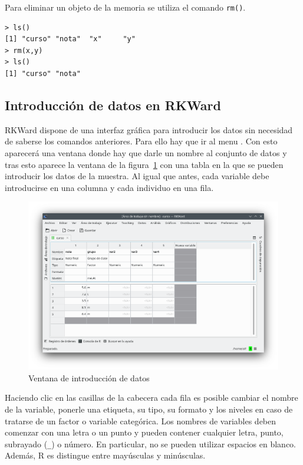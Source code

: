 Para eliminar un objeto de la memoria se utiliza el comando \lstinline{rm()}.
\begin{lstlisting}
> ls()
[1] "curso" "nota"  "x"     "y"    
> rm(x,y)
> ls()
[1] "curso" "nota"
\end{lstlisting}


\subsection{Introducción de datos en RKWard}
RKWard dispone de una interfaz gráfica para introducir los datos sin necesidad de saberse los comandos anteriores.
Para ello hay que ir al menu . Con esto
aparecerá una ventana donde hay que darle un nombre al conjunto de datos y tras esto aparece la ventana de la
figura~\ref{g:matriz_datos} con una tabla en la que se pueden introducir los datos de la muestra.
Al igual que antes, cada variable debe introducirse en una columna y cada individuo en una fila.

\begin{figure}[htp]
\begin{center}
  \includegraphics[width=\textwidth]{capitulos/introduccion/img/matriz_datos}
  \caption{Ventana de introducción de datos}
  \label{g:matriz_datos}
\end{center}
\end{figure}

Haciendo clic en las casillas de la cabecera cada fila es posible cambiar el nombre de la variable, ponerle una
etiqueta, su tipo, su formato y los niveles en caso de tratarse de un factor o variable categórica.
Los nombres de variables deben comenzar con una letra o un punto y pueden contener cualquier letra, punto, subrayado
(\lstinline{_}) o número.
En particular, no se pueden utilizar espacios en blanco.
Además, R es distingue entre mayúsculas y minúsculas.

